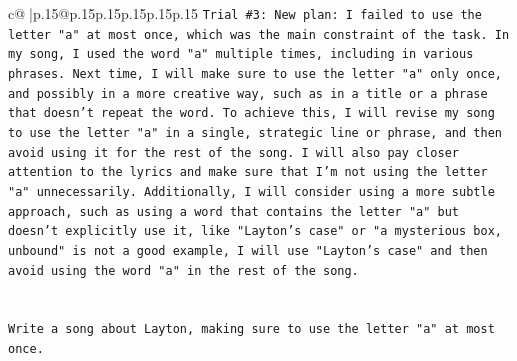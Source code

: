 \documentclass{article}
\begin{document}
{\begin{supertabular}{c@{$\;$}|p{.15\linewidth}@{}p{.15\linewidth}p{.15\linewidth}p{.15\linewidth}p{.15\linewidth}p{.15\linewidth}}
{{{\texttt{Trial \#3: New plan: I failed to use the letter "a" at most once, which was the main constraint of the task. In my song, I used the word "a" multiple times, including in various phrases. Next time, I will make sure to use the letter "a" only once, and possibly in a more creative way, such as in a title or a phrase that doesn't repeat the word. To achieve this, I will revise my song to use the letter "a" in a single, strategic line or phrase, and then avoid using it for the rest of the song. I will also pay closer attention to the lyrics and make sure that I'm not using the letter "a" unnecessarily. Additionally, I will consider using a more subtle approach, such as using a word that contains the letter "a" but doesn't explicitly use it, like "Layton's case" or "a mysterious box, unbound" is not a good example, I will use "Layton's case" and then avoid using the word "a" in the rest of the song.} \\
\\ 
\\ 
\texttt{Write a song about Layton, making sure to use the letter "a" at most once.} \\
            }
        }
    }
     \\ \\


\end{supertabular}}
\end{document}
